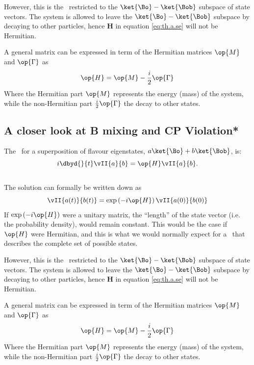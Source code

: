  However, this is the \Se\ restricted to the $\ket{\Bo}-\ket{\Bob}$
 subspace of state vectors. The system is allowed to leave the
 $\ket{\Bo}-\ket{\Bob}$ subspace by decaying to other particles,
 hence $\mathbf{H}$ in equation \ref{eq:th.a.se} will not be
 Hermitian.

 A general matrix  can be expressed in term of the Hermitian
 matrices $\op{M}$ and $\op{\Gamma}$ as
\begin{equation}
 \op{H} = \op{M} - \frac{i}{2} \op{\Gamma}
\end{equation}
 Where the Hermitian part $\op{M}$ represents the energy (mass) of the
 system, while the non-Hermitian part $\frac{i}{2} \op{\Gamma}$ the
 decay to other states.


\subsection{A closer look at B mixing and CP Violation*}
\label{sec:details}
The \Se\ for a superposition of flavour eigenstates, $ a \ket{\Bo} + b
\ket{\Bob}$, is:
\begin{equation}
\label{eq:th.a.se}
%
i\dbyd{}{t}\vII{a}{b}= \op{H} \vII{a}{b}.
%
\end{equation}\\
 The solution can formally be written down as
\begin{equation}
 \vII{a(t)}{b(t)} = \exp\left(-i\op{H}\right) \vII{a(0)}{b(0)}
\end{equation}
 If $\exp\left(-i\op{H}\right)$ were a unitary matrix, the ``length''
 of the state vector (i.e. the probability density), would remain
 constant. This would be the case if $\op{H}$ were Hermitian, and this
 is what we would normally expect for a \Se\ that describes the
 complete set of possible states.
 
 However, this is the \Se\ restricted to the $\ket{\Bo}-\ket{\Bob}$
 subspace of state vectors. The system is allowed to leave the
 $\ket{\Bo}-\ket{\Bob}$ subspace by decaying to other particles,
 hence $\mathbf{H}$ in equation \ref{eq:th.a.se} will not be
 Hermitian.

 A general matrix  can be expressed in term of the Hermitian
 matrices $\op{M}$ and $\op{\Gamma}$ as
\begin{equation}
 \op{H} = \op{M} - \frac{i}{2} \op{\Gamma}
\end{equation}
 Where the Hermitian part $\op{M}$ represents the energy (mass) of the
 system, while the non-Hermitian part $\frac{i}{2} \op{\Gamma}$ the
 decay to other states.

